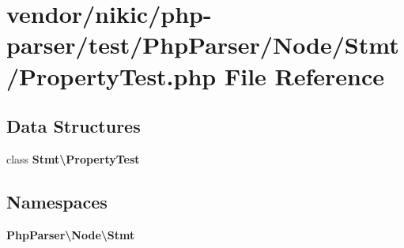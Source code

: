 \section{vendor/nikic/php-\/parser/test/\+Php\+Parser/\+Node/\+Stmt/\+Property\+Test.php File Reference}
\label{_node_2_stmt_2_property_test_8php}
\subsection*{Data Structures}
\begin{DoxyCompactItemize}
\item 
class {\bf Stmt\textbackslash{}\+Property\+Test}
\end{DoxyCompactItemize}
\subsection*{Namespaces}
\begin{DoxyCompactItemize}
\item 
 {\bf Php\+Parser\textbackslash{}\+Node\textbackslash{}\+Stmt}
\end{DoxyCompactItemize}
